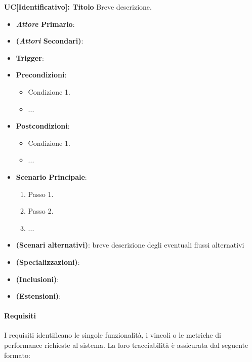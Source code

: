 \documentclass[12pt, a4paper]{article}
\begin{document}
\noindent \textbf{UC[Identificativo]: Titolo} \newline
Breve descrizione.
\begin{itemize}
    \item \textbf{\textit{Attore} Primario}:
    \item \textbf{(\textit{Attori} Secondari)}:
    \item \textbf{Trigger}: 
    \item \textbf{Precondizioni}: 
        \begin{itemize}
            \item Condizione 1.
            \item ...
        \end{itemize}
    \item \textbf{Postcondizioni}: 
        \begin{itemize}
            \item Condizione 1.
            \item ...
        \end{itemize}
    \item \textbf{Scenario Principale}:
        \begin{enumerate}
            \item Passo 1.
            \item Passo 2.
            \item ...
        \end{enumerate}
    \item \textbf{(Scenari alternativi)}:
        breve descrizione degli eventuali flussi alternativi
    \item \textbf{(Specializzazioni)}:
    \item \textbf{(Inclusioni)}:
    \item \textbf{(Estensioni)}:
\end{itemize}
\newpage

\paragraph{Requisiti}
I requisiti identificano le singole funzionalità, i vincoli o le metriche di performance richieste al sistema. La loro tracciabilità è assicurata dal seguente formato:
\end{document}
